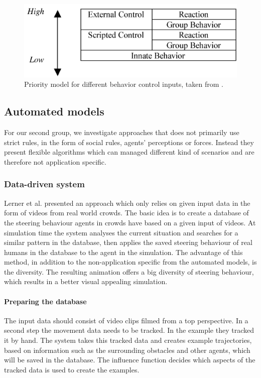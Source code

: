 \documentclass{acmsiggraph}               %
\begin{document}
\begin{figure}[h]
  \centering
  \includegraphics[width=0.8\linewidth]{images/ViCrowdPriorityModel.png}
  \caption{Priority model for different behavior control inputs, taken from \protect\cite{musse_hierarchical_2001}.}
  \label{fig:viCrowdPriority}
\end{figure}

\subsection{Automated models}

For our second group, we investigate approaches that does not primarily use strict rules, in the form of social rules, agents' perceptions or forces. Instead they present flexible algorithms which can managed different kind of scenarios and are therefore not application specific.    

\subsubsection{Data-driven system}
Lerner et al.  \label{exp:lerner_crowds_2007} presented an approach which only relies on given input data in the form of videos from real world crowds. The basic idea is to create a database of the steering behaviour agents in crowds have based on a given input of videos. At simulation time the system analyses the current situation and searches for a similar pattern in the database, then applies the saved steering behaviour of real humans in the database to the agent in the simulation. The advantage of this method, in addition to the non-application specific from the automated models, is the diversity. The resulting animation offers a big diversity of steering behaviour, which results in a better visual appealing simulation. 

\paragraph{Preparing the database}
The input data should consist of video clips filmed from a top perspective. In a second step the movement data needs to be tracked. In the example they tracked it by hand.
The system takes this tracked data and creates example trajectories, based on information such as the surrounding obstacles and other agents, which will be saved in the database. The influence function decides which aspects of the tracked data is used to create the examples. 
\end{document}
